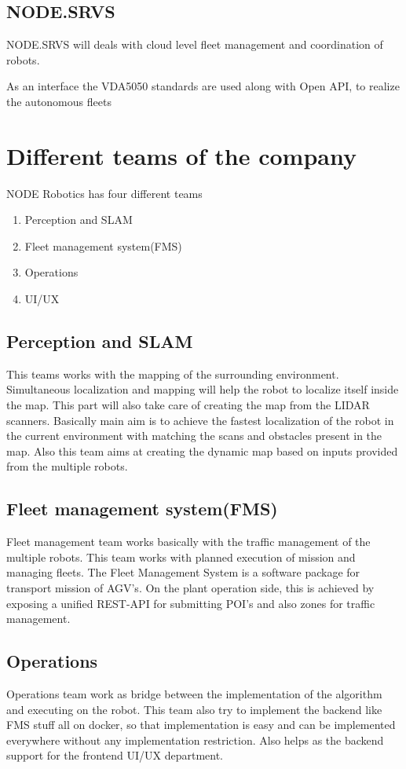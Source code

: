 \subsection{NODE.SRVS}
NODE.SRVS will deals with cloud level fleet management and coordination of robots.

\vspace{0.5cm}
As an interface the VDA5050 standards are used along with Open API, to realize the autonomous fleets

\pagebreak
\section{Different teams of the company}
NODE Robotics has four different teams
\begin{enumerate}
	\item Perception and SLAM
	\item Fleet management system(FMS)
	\item Operations
	\item UI/UX

\end{enumerate}
\subsection{Perception and SLAM}
 This teams works with the mapping of the surrounding environment. Simultaneous localization and mapping will help the robot to localize itself inside the map. This part will also take care of creating the map from the LIDAR scanners. Basically main aim is to achieve the fastest localization of the robot in the current environment with matching the scans and obstacles present in the map. Also this team aims at creating the dynamic map based on inputs provided from the multiple robots.

\subsection{Fleet management system(FMS)}
Fleet management team works basically with the traffic management of the multiple robots. This team works with planned execution of mission and managing fleets. The Fleet Management System is a software package for transport mission of AGV's. On the plant operation side, this is achieved by exposing a unified REST-API for submitting POI's and also zones for traffic management.
\subsection{Operations}
Operations team work as bridge between the implementation of the algorithm and executing on the robot. This team also try to implement the backend like FMS stuff all on docker, so that implementation is easy and can be implemented everywhere without any implementation restriction. Also helps as the backend support for the frontend UI/UX department.
